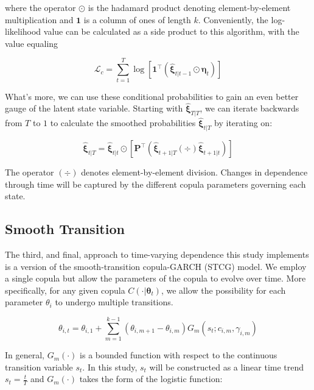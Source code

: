 \documentclass[12pt]{article}
\newcommand{\Lagr}{\mathcal{L}}
\newcommand{\boldXi}{\hat{\boldsymbol{\xi}}}
\begin{document}
where the operator $\odot$ is the hadamard product denoting element-by-element multiplication and $\mathbf{1}$ is a column of ones of length $k$. Conveniently, the log-likelihood value can be calculated as a side product to this algorithm, with the value equaling

\begin{equation}
\Lagr_{c} = \sum_{t=1}^{T}\log \left[\mathbf{1}^{\top}\left(\boldXi_{t|t-1} \odot \boldsymbol{\eta}_{t}\right)\right] 
\end{equation}

What's more, we can use these conditional probabilities to gain an even better gauge of the latent state variable. Starting with $\boldXi_{T|T}$, we can iterate backwards from $T$ to $1$ to calculate the smoothed probabilities $\boldXi_{t|T}$ by iterating on:

\begin{equation}
	\boldXi_{t|T} = \boldXi_{t|t} \odot \left[\mathbf{P}^{\top}\left(\boldXi_{t+1|T}\left(\div\right)\boldXi_{t+1|t}\right)\right]
\end{equation}

The operator $\left(\div\right)$ denotes element-by-element division. Changes in dependence through time will be captured by the different copula parameters governing each state.

\subsection{Smooth Transition}

The third, and final, approach to time-varying dependence this study implements is a version of the smooth-transition copula-GARCH (STCG) model. We employ a single copula but allow the parameters of the copula to evolve over time. More specifically, for any given copula $C\left(\cdot | \mathbf{\theta}_{t}\right)$, we allow the possibility for each parameter $\theta_{i}$ to undergo multiple transitions.

\begin{equation} \label{eqn:smoothTrans}
	\theta_{i,t} = \theta_{i,1} + \sum_{m=1}^{k-1}\left(\theta_{i,m+1} - \theta_{i,m}\right) G_{m}\left(s_{t}; c_{i,m},\gamma_{i,m}\right)
\end{equation}

In general, $G_{m}\left(\cdot\right)$ is a bounded function with respect to the continuous transition variable $s_{t}$. In this study, $s_{t}$ will be constructed as a linear time trend $s_{t}=\frac{t}{T}$ and $G_{m}\left(\cdot\right)$ takes the form of the logistic function:
\end{document}
